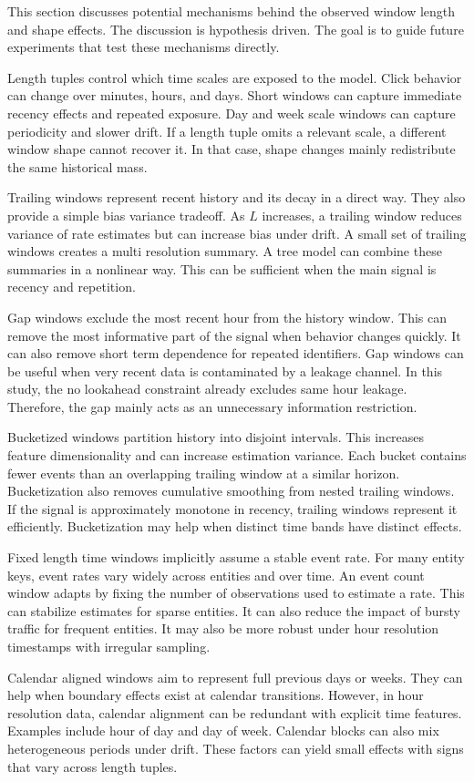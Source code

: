 This section discusses potential mechanisms behind the observed window length and shape effects.
The discussion is hypothesis driven.
The goal is to guide future experiments that test these mechanisms directly.

Length tuples control which time scales are exposed to the model.
Click behavior can change over minutes, hours, and days.
Short windows can capture immediate recency effects and repeated exposure.
Day and week scale windows can capture periodicity and slower drift.
If a length tuple omits a relevant scale, a different window shape cannot recover it.
In that case, shape changes mainly redistribute the same historical mass.

Trailing windows represent recent history and its decay in a direct way.
They also provide a simple bias variance tradeoff.
As $L$ increases, a trailing window reduces variance of rate estimates but can increase bias under drift.
A small set of trailing windows creates a multi resolution summary.
A tree model can combine these summaries in a nonlinear way.
This can be sufficient when the main signal is recency and repetition.

Gap windows exclude the most recent hour from the history window.
This can remove the most informative part of the signal when behavior changes quickly.
It can also remove short term dependence for repeated identifiers.
Gap windows can be useful when very recent data is contaminated by a leakage channel.
In this study, the no lookahead constraint already excludes same hour leakage.
Therefore, the gap mainly acts as an unnecessary information restriction.

Bucketized windows partition history into disjoint intervals.
This increases feature dimensionality and can increase estimation variance.
Each bucket contains fewer events than an overlapping trailing window at a similar horizon.
Bucketization also removes cumulative smoothing from nested trailing windows.
If the signal is approximately monotone in recency, trailing windows represent it efficiently.
Bucketization may help when distinct time bands have distinct effects.

Fixed length time windows implicitly assume a stable event rate.
For many entity keys, event rates vary widely across entities and over time.
An event count window adapts by fixing the number of observations used to estimate a rate.
This can stabilize estimates for sparse entities.
It can also reduce the impact of bursty traffic for frequent entities.
It may also be more robust under hour resolution timestamps with irregular sampling.

Calendar aligned windows aim to represent full previous days or weeks.
They can help when boundary effects exist at calendar transitions.
However, in hour resolution data, calendar alignment can be redundant with explicit time features.
Examples include hour of day and day of week.
Calendar blocks can also mix heterogeneous periods under drift.
These factors can yield small effects with signs that vary across length tuples.
